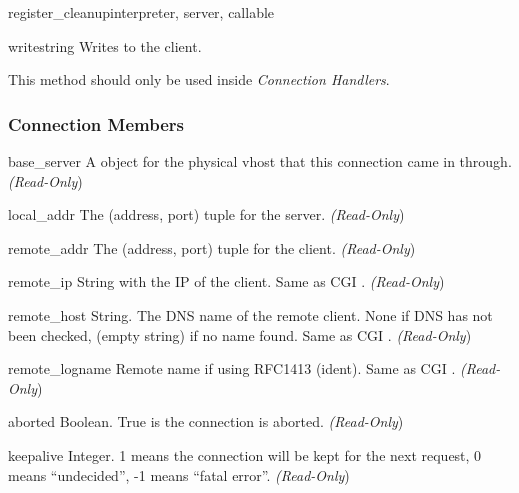 \begin{funcdesc}{register_cleanup}{interpreter, server, callable}
\begin{methoddesc}[connection]{write}{string}
  Writes  to the client.

  This method should only be used inside \emph{Connection Handlers}.

\end{methoddesc}

\subsubsection{Connection Members\label{pyapi-mpconn-mem}}

\begin{memberdesc}[connection]{base_server}
  A  object for the physical vhost that this connection came in
  through.
  \emph{(Read-Only})
\end{memberdesc}

\begin{memberdesc}[connection]{local_addr}
  The (address, port) tuple for the server.
  \emph{(Read-Only})
\end{memberdesc}

\begin{memberdesc}[connection]{remote_addr}
  The (address, port) tuple for the client.
  \emph{(Read-Only})
\end{memberdesc}

\begin{memberdesc}[connection]{remote_ip}
  String with the IP of the client. Same as CGI .
  \emph{(Read-Only})
\end{memberdesc}

\begin{memberdesc}[connection]{remote_host}
  String. The DNS name of the remote client. None if DNS has not been
  checked,  (empty string) if no name found. Same as CGI .
  \emph{(Read-Only})
\end{memberdesc}

\begin{memberdesc}[connection]{remote_logname}
  Remote name if using RFC1413 (ident). Same as CGI .
  \emph{(Read-Only})
\end{memberdesc}

\begin{memberdesc}[connection]{aborted}
  Boolean. True is the connection is aborted.
  \emph{(Read-Only})
\end{memberdesc}

\begin{memberdesc}[connection]{keepalive}
  Integer. 1 means the connection will be kept for the next request, 0 means
  ``undecided'', -1 means ``fatal error''.
  \emph{(Read-Only})
\end{memberdesc}


\end{funcdesc}

